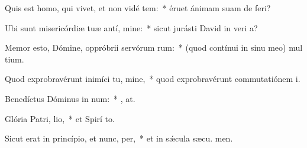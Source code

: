 \item Quis est homo, qui vivet, et non vidé tem:~* éruet ánimam suam de  feri?
\item Ubi sunt misericórdiæ tuæ antí, mine:~* sicut jurásti David in veri a?
\item Memor esto, Dómine, oppróbrii servórum rum:~* (quod contínui in sinu meo) mul tium.
\item Quod exprobravérunt inimíci tu, mine,~* quod exprobravérunt commutatiónem  i.
\item Benedíctus Dóminus in num:~* , at.
\item Glória Patri,  lio,~* et Spirí to.
\item Sicut erat in princípio, et nunc,  per,~* et in sǽcula sæcu. men.
